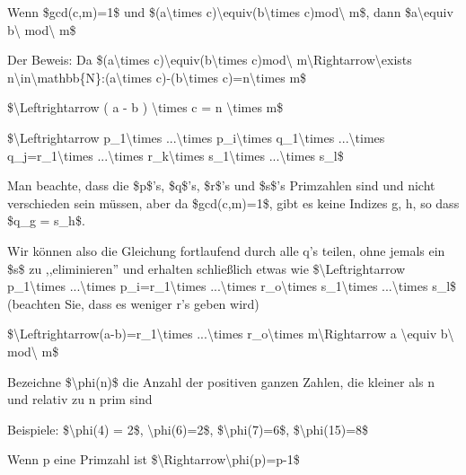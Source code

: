 \documentclass[a4paper]{article}
\begin{document}
\begin{multicols}{3}
\begin{itemize*}
\begin{itemize*}
                  \begin{itemize*} \item Wenn \$gcd(c,m)=1\$ und \$(a\textbackslash times c)\textbackslash equiv(b\textbackslash times c)mod\textbackslash{} m\$, dann \$a\textbackslash equiv b\textbackslash{} mod\textbackslash{} m\$ \item Der Beweis: Da \$(a\textbackslash times c)\textbackslash equiv(b\textbackslash times c)mod\textbackslash{} m\textbackslash Rightarrow\textbackslash exists n\textbackslash in\textbackslash mathbb\{N\}:(a\textbackslash times c)-(b\textbackslash times c)=n\textbackslash times m\$ \item \$\textbackslash Leftrightarrow ( a - b ) \textbackslash times c = n \textbackslash times m\$ \item \$\textbackslash Leftrightarrow p\_1\textbackslash times ...\textbackslash times p\_i\textbackslash times q\_1\textbackslash times ...\textbackslash times q\_j=r\_1\textbackslash times ...\textbackslash times r\_k\textbackslash times s\_1\textbackslash times ...\textbackslash times s\_l\$ \item Man beachte, dass die \$p\$'s, \$q\$'s, \$r\$'s und \$s\$'s Primzahlen sind und nicht verschieden sein müssen, aber da \$gcd(c,m)=1\$, gibt es keine Indizes g, h, so dass \$q\_g = s\_h\$. \item Wir können also die Gleichung fortlaufend durch alle q's teilen, ohne jemals ein \$s\$ zu ,,eliminieren'' und erhalten schließlich etwas wie \$\textbackslash Leftrightarrow p\_1\textbackslash times ...\textbackslash times p\_i=r\_1\textbackslash times ...\textbackslash times r\_o\textbackslash times s\_1\textbackslash times ...\textbackslash times s\_l\$ (beachten Sie, dass es weniger r's geben wird) \item \$\textbackslash Leftrightarrow(a-b)=r\_1\textbackslash times ...\textbackslash times r\_o\textbackslash times m\textbackslash Rightarrow a \textbackslash equiv b\textbackslash{} mod\textbackslash{} m\$ \end{itemize*}
                  \item Bezeichne \$\textbackslash phi(n)\$ die Anzahl der positiven ganzen Zahlen, die kleiner als n und relativ zu n prim sind
                  \begin{itemize*} \item Beispiele: \$\textbackslash phi(4) = 2\$, \textbackslash phi(6)=2\$, \$\textbackslash phi(7)=6\$, \$\textbackslash phi(15)=8\$ \item Wenn p eine Primzahl ist \$\textbackslash Rightarrow\textbackslash phi(p)=p-1\$ \end{itemize*}

\end{itemize*}
\end{itemize*}
\end{multicols}
\end{document}

